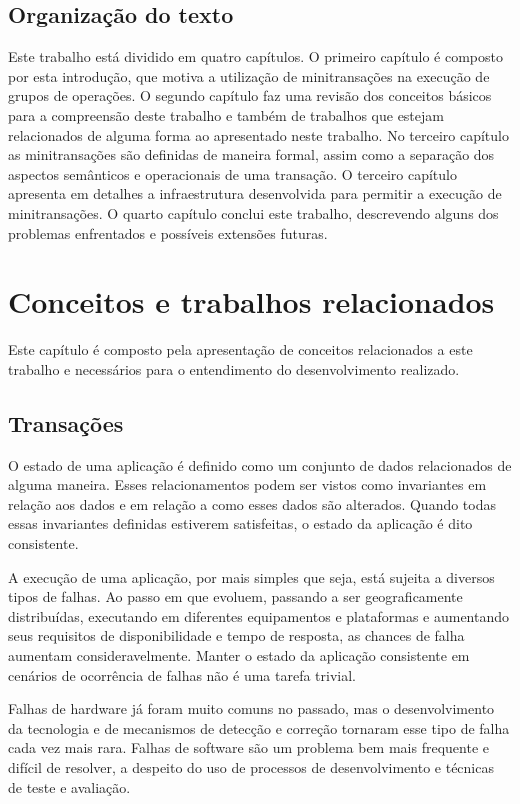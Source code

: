 \documentclass[11pt,twoside,a4paper]{book}
\begin{document}
\section{Organização do texto}
\label{sec:organizacao_do_texto}
Este trabalho está dividido em quatro capítulos. O primeiro capítulo é composto por esta introdução, que motiva a utilização de minitransações na execução de grupos de operações. O segundo capítulo faz uma revisão dos conceitos básicos para a compreensão deste trabalho e também de trabalhos que estejam relacionados de alguma forma ao apresentado neste trabalho. No terceiro capítulo as minitransações são definidas de maneira formal, assim como a separação dos aspectos semânticos e operacionais de uma transação. O terceiro capítulo apresenta em detalhes a infraestrutura desenvolvida para permitir a execução de minitransações. O quarto capítulo conclui este trabalho, descrevendo alguns dos problemas enfrentados e possíveis extensões futuras.

\chapter{Conceitos e trabalhos relacionados}
\label{chap:conceitos_e_trabalhos_relacionados}
Este capítulo é composto pela apresentação de conceitos relacionados a este trabalho e necessários para o entendimento do desenvolvimento realizado.

\section{Transações}
\label{sec:transacoes}
O estado de uma aplicação é definido como um conjunto de dados relacionados de alguma maneira. Esses relacionamentos podem ser vistos como invariantes em relação aos dados e em relação a como esses dados são alterados. Quando todas essas invariantes definidas estiverem satisfeitas, o estado da aplicação é dito consistente.

A execução de uma aplicação, por mais simples que seja, está sujeita a diversos tipos de falhas. Ao passo em que evoluem, passando a ser geograficamente distribuídas, executando em diferentes equipamentos e plataformas e aumentando seus requisitos de disponibilidade e tempo de resposta, as chances de falha aumentam consideravelmente. Manter o estado da aplicação consistente em cenários de ocorrência de falhas não é uma tarefa trivial.

Falhas de hardware já foram muito comuns no passado, mas o desenvolvimento da tecnologia e de mecanismos de detecção e correção tornaram esse tipo de falha cada vez mais rara. Falhas de software são um problema bem mais frequente e difícil de resolver, a despeito do uso de processos de desenvolvimento e técnicas de teste e avaliação.
\end{document}
